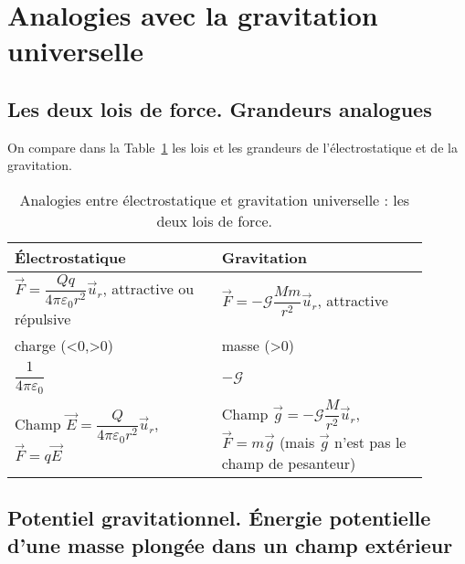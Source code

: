 \section{Analogies avec la gravitation universelle}

    \subsection{Les deux lois de force. Grandeurs analogues}

    On compare dans la Table~\ref{tab:analogie_gravitation_universelle_lois_de_force} les lois et les grandeurs de l'électrostatique et de la gravitation.
    \begin{table}
        \centering
        \begin{tabular}{p{0.45\linewidth}|p{0.45\linewidth}}
            \toprule
            Électrostatique & Gravitation \\ \midrule
            $\vec{F}=\dfrac{Qq}{4\pi\varepsilon_0 r^{2}}\vec{u}_r$, attractive ou répulsive& $\vec{F}=-\mathcal{G}\dfrac{Mm}{r^{2}}\vec{u}_r$, attractive\\ \midrule
            charge (<0,>0)& masse (>0)\\ \midrule
            $\dfrac{1}{4\pi\varepsilon_0}$&$-\mathcal{G}$\\ \midrule
            Champ $\vec{E}=\dfrac{Q}{4\pi\varepsilon_0 r^{2}}\vec{u}_r$, $\vec{F}=q\vec{E}$ & Champ $\vec{g}=-\mathcal{G}\dfrac{M}{r^{2}}\vec{u}_r$, $\vec{F}=m\vec{g}$ (mais $\vec{g}$ n'est pas le champ de pesanteur)\\ \bottomrule
        \end{tabular}    
        \caption{Analogies entre électrostatique et gravitation universelle : les deux lois de force.}
        \label{tab:analogie_gravitation_universelle_lois_de_force}
    \end{table}

    \subsection[Potentiel gravitationnel]{Potentiel gravitationnel. Énergie potentielle\\d'une masse plongée dans un champ extérieur}

